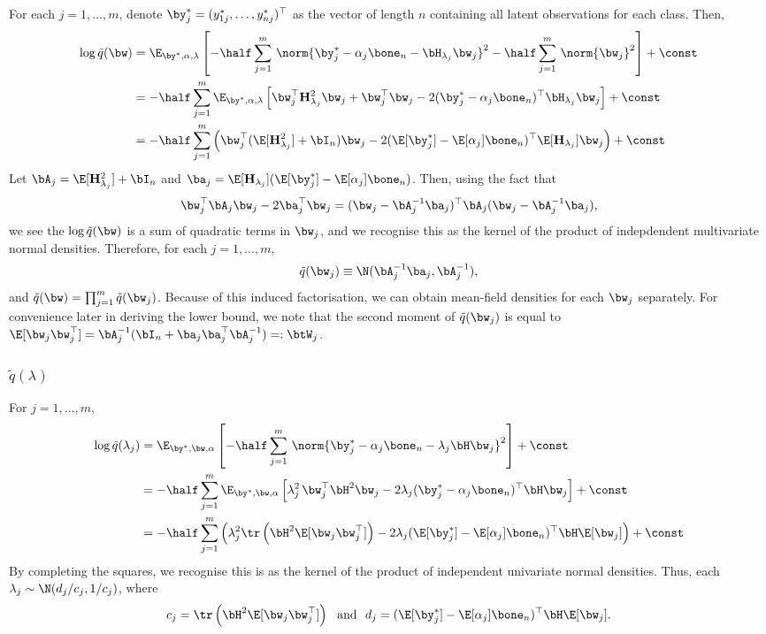 \documentclass[]{article}
\begin{document}
For each $j = 1,\dots, m$, denote $\by^*_j = (y_{1j}^*, \dots, y_{nj}^*)^\top$ as the vector of length $n$ containing all latent observations for each class. Then,
\begin{align*}
  \log \tilde q(\bw) 
  &= \E_{\by^*, \alpha, \lambda} \left[ 
  - \half \sum_{j=1}^m \, \norm{ \by^*_j - \alpha_j\bone_{n} - \bH_{\lambda_j} \bw_j }^2 
  - \half \sum_{j=1}^m \, \norm{\bw_j}^2 
  \right] + \const \\
  &= -\half \sum_{j=1}^m \E_{\by^*, \alpha, \lambda} \left[  
  \bw_j^\top \mathbf H_{\lambda_j}^2 \bw_j + \bw_j^\top\bw_j 
  - 2(\by_j^* - \alpha_j\bone_n)^\top\bH_{\lambda_j}\bw_j 
  \right] + \const \\
  &= -\half \sum_{j=1}^m \Big(  \bw_j^\top (\E[\mathbf H_{\lambda_j}^2] + \bI_{n}) \bw_j - 2(\E[\by_j^*] - \E[\alpha_j]\bone_{n})^\top\E[\mathbf H_{\lambda_j}]\bw_j \Big) + \const
\end{align*}
Let $\bA_j = \E[\mathbf H_{\lambda_j}^2] + \bI_{n}$ and $\ba_j = \E[\mathbf H_{\lambda_j}](\E[\by_j^*] - \E[\alpha_j]\bone_{n})$. Then, using the fact that
\[
  \bw_j^\top \bA_j \bw_j - 2 \ba_j^\top\bw_j = (\bw_j - \bA_j^{-1}\ba_j)^\top\bA_j(\bw_j - \bA_j^{-1}\ba_j),
\]
we see the $\log \tilde q(\bw)$ is a sum of quadratic terms in $\bw_j$, and we recognise this as the kernel of the product of indepdendent multivariate normal densities. Therefore, for each $j=1,\dots,m$,
\[
  \tilde q(\bw_j) \equiv \N(\bA_j^{-1}\ba_j, \bA_j^{-1}),
\]
and $\tilde q(\bw) = \prod_{j=1}^m \tilde q(\bw_j)$. Because of this induced factorisation, we can obtain mean-field densities for each $\bw_j$ separately. For convenience later in deriving the lower bound, we note that the second moment of $\tilde q(\bw_j)$ is equal to $\E[\bw_j\bw_j^\top] = \bA_j^{-1}(\bI_{n} + \ba_j\ba_j^\top\bA_j^{-1}) =: \btW_j$.

\subsubsection{$\tilde q(\lambda)$}

For $j = 1,\dots,m$,
\begin{align*}
  \log \tilde q(\lambda_j) 
  &= \E_{\by^*, \bw, \alpha} \left[ 
  - \half \sum_{j=1}^m \, \norm{\by_j^* - \alpha_j\bone_{n} - \lambda_j\bH\bw_j}^2  
  \right] + \const \\
  &= - \half \sum_{j=1}^m \E_{\by^*, \bw, \alpha} \left[ 
  \lambda_j^2 \, \bw_j^\top \bH^2 \bw_j 
  - 2\lambda_j (\by_j^* - \alpha_j\bone_{n})^\top \bH \bw_j \right] 
  + \const \\  
  &= - \half \sum_{j=1}^m \Big( \lambda_j^2 \tr \left(  \bH^2 \E[\bw_j \bw_j^\top] \right) - 2 \lambda_j (\E[\by_j^*] - \E[\alpha_j]\bone_{n})^\top \bH \E[\bw_j] \Big) + \const
\end{align*}
By completing the squares, we recognise this is as the kernel of the product of independent univariate normal densities. Thus, each $\lambda_j \sim \N(d_j/c_j, 1/c_j)$, where
\begin{gather*}
  c_j = \tr \left(  \bH^2 \E[\bw_j \bw_j^\top] \right) 
  \ \text{ and } \
  d_j = (\E[\by_j^*] - \E[\alpha_j]\bone_{n})^\top \bH \E[\bw_j].
\end{gather*}
\end{document}
